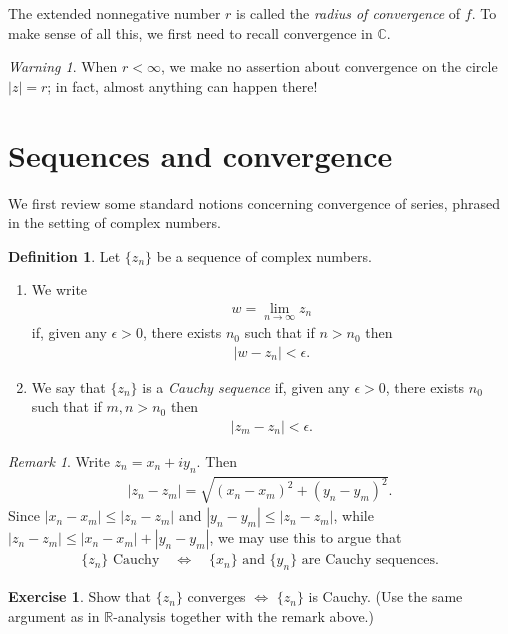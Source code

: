 \documentclass[11pt]{article}
\theoremstyle{plain}
\theoremstyle{definition}
\newtheorem{definition}[theorem]{Definition}
\newtheorem{exercise}[theorem]{Exercise}
\theoremstyle{remark}
\newtheorem*{remark}{Remark}
\newtheorem*{warning}{Warning}
\numberwithin{equation}{section}
\newcommand{\be}{\begin{eqnarray}}
\newcommand{\ee}{\end{eqnarray}}
\newcommand{\C}{\mathbb{C}}
\newcommand{\R}{\mathbb{R}}
\begin{document}
\begin{center}
\end{center}

The extended nonnegative number $r$ is called the \emph{radius of
convergence} of $f$. To make sense of all this, we first need to recall
convergence in $\C$.

\begin{warning}
When $r<\infty$, we make no assertion about convergence on the circle
$|z|=r$; in fact, almost anything can happen there!
\end{warning}

\section{Sequences and convergence}

We first review some standard notions concerning convergence of series,
phrased in the setting of complex numbers.


\begin{definition}
Let $\{z_n\}$ be a sequence of complex numbers.
\begin{enumerate}
\item We write
\be
 \boxed{\ w=\lim_{n\to\infty}z_n\ }
\ee
if, given any $\epsilon>0$, there exists $n_0$ such that if $n>n_0$ then
\be
 |w-z_n|<\epsilon.
\ee
\item We say that $\{z_n\}$ is a \emph{Cauchy sequence} if, given any
$\epsilon>0$, there exists $n_0$ such that if $m,n>n_0$ then
\be
 |z_m-z_n|<\epsilon.
\ee

\end{enumerate}
\end{definition}

\begin{remark}
Write $z_n=x_n+iy_n$. Then
\be
 |z_n-z_m|=\sqrt{(x_n-x_m)^2+(y_n-y_m)^2}.
\ee
Since $|x_n-x_m|\le|z_n-z_m|$ and $|y_n-y_m|\le|z_n-z_m|$, while
$|z_n-z_m|\le|x_n-x_m|+|y_n-y_m|$, we may use this to argue that
\be
 \{z_n\}\text{ Cauchy}
 \quad\Longleftrightarrow\quad
 \{x_n\}\text{ and }\{y_n\}\text{ are Cauchy sequences.}
\ee
\end{remark}

\begin{exercise}
Show that $\{z_n\}$ converges $\Longleftrightarrow$ $\{z_n\}$ is Cauchy.
(Use the same argument as in $\R$-analysis together with the remark above.)
\end{exercise}
\end{document}

